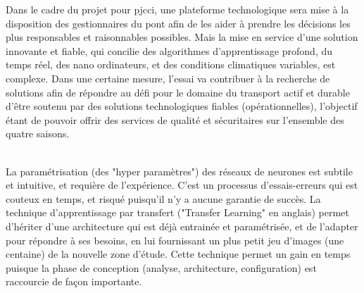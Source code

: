 ﻿\noindent Dans le cadre du projet pour \acrshort{pjcci}, une plateforme technologique sera mise à la disposition des gestionnaires du pont afin de les aider à prendre les décisions les plus responsables et raisonnables possibles. Mais la mise en service d'une solution innovante et fiable, qui concilie des algorithmes d'apprentissage profond, du temps réel, des nano ordinateurs, et des conditions climatiques variables, est complexe. Dans une certaine mesure, l'essai va contribuer à la recherche de solutions afin de répondre au défi pour le domaine du transport actif et durable d'être soutenu par des solutions technologiques fiables (opérationnelles), l'objectif étant de pouvoir offrir des services de qualité et sécuritaires sur l'ensemble des quatre saisons.
\begin{comment}
\vspace{\baselineskip}
\\
\noindent Il est difficile de trouver des jeux de données pour entrainer les réseaux de neurones pleinement connectés (\acrshort{fcn}) adaptés à la problématique. La technique de transfert d'apprentissage permet de démarrer d'une architecture qui a déjà appris avec un jeu d'images important (milliers d'images), et de lui faire apprendre davantage, en lui fournissant un plus petit jeu d'images (centaines d'images) de la nouvelle zone d'étude. Par exemple une architecture peut avoir appris à classifier des images de la Californie, aux États-Unis. Pour lui permettre de classifier des images de la Ville de Sherbrooke, il est souhaitable de lui fournir un nouveau jeu de données spécifique à cette ville afin qu'il s'adapte (ses paramètres) à cette région. Dans le contexte de cet essai, cela se traduit par ré entrainer différents modèles avec des images de la piste multifonctionnelle du pont Jacques-Cartier.
\end{comment}
\vspace{\baselineskip}
\\
\noindent La paramétrisation (des "hyper paramètres") des réseaux de neurones est subtile et intuitive, et requière de l'expérience. C'est un processus d'essais-erreurs qui est couteux en temps, et risqué puisqu'il n'y a aucune garantie de succès. La technique d'apprentissage par transfert ("Transfer Learning" en anglais) permet d'hériter d'une architecture qui est déjà entrainée et paramétrisée, et de l'adapter pour répondre à ses besoins, en lui fournissant un plus petit jeu d'images (une centaine) de la nouvelle zone d'étude. Cette technique permet un gain en temps puisque la phase de conception (analyse, architecture, configuration) est raccourcie de façon importante.
